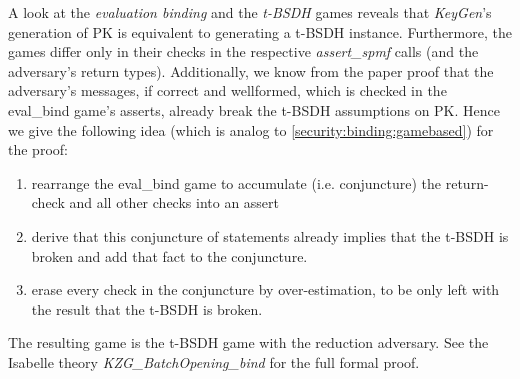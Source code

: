 A look at the \textit{evaluation binding} and the \textit{t-BSDH} games reveals that \textit{KeyGen}'s generation of PK is equivalent to generating a t-BSDH instance. Furthermore, the games differ only in their checks in the respective \textit{assert\_spmf} calls (and the adversary's return types).  
Additionally, we know from the paper proof that the adversary's messages, if correct and wellformed, which is checked in the eval\_bind game's asserts, already break the t-BSDH assumptions on PK. 
Hence we give the following idea (which is analog to \ref{security:binding:gamebased}) for the proof:
\begin{enumerate}
    \item rearrange the eval\_bind game to accumulate (i.e. conjuncture) the return-check and all other checks into an assert
    \item derive that this conjuncture of statements already implies that the t-BSDH is broken and add that fact to the conjuncture.
    \item erase every check in the conjuncture by over-estimation, to be only left with the result that the t-BSDH is broken.
\end{enumerate}
The resulting game is the t-BSDH game with the reduction adversary. 
See the Isabelle theory \textit{KZG\_BatchOpening\_bind} for the full formal proof.




